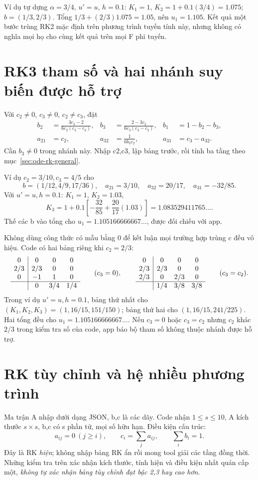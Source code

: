 Ví dụ tự dựng $\alpha=3/4$, $u'=u$, $h=0.1$: $K_1=1$, $K_2=1+0.1(3/4)=1.075$; $b=(1/3,2/3)$. Tổng $1/3+(2/3)1.075=1.05$, nên $u_1=1.105$. Kết quả một bước trùng RK2 mặc định trên phương trình tuyến tính này, nhưng không có nghĩa mọi họ cho cùng kết quả trên mọi F phi tuyến.

\section{RK3 tham số và hai nhánh suy biến được hỗ trợ}
\label{sec:ode-rk3-parameter}
Với $c_2\ne0$, $c_3\ne0$, $c_2\ne c_3$, đặt
\begin{align*}
b_2&=\frac{3c_3-2}{6c_2(c_3-c_2)},&
b_3&=\frac{2-3c_2}{6c_3(c_3-c_2)},&b_1&=1-b_2-b_3,\\
a_{21}&=c_2,&a_{32}&=\frac1{6b_3c_2},&a_{31}&=c_3-a_{32}.
\end{align*}
Cần $b_3\ne0$ trong nhánh này. Nhập c2,c3, lập bảng trước, rồi tính ba tầng theo mục~\ref{sec:ode-rk-general}.

Ví dụ $c_2=3/10,c_3=4/5$ cho
\[
b=(1/12,4/9,17/36),\quad a_{21}=3/10,
\quad a_{32}=20/17,\quad a_{31}=-32/85.
\]
Với $u'=u,h=0.1$: $K_1=1$, $K_2=1.03$,
\[
K_3=1+0.1\left[-\frac{32}{85}+\frac{20}{17}(1.03)\right]
=1.083529411765\ldots.
\]
Thế các b vào tổng cho $u_1=1.105166666667\ldots$, được đối chiếu với app.

Không dùng công thức có mẫu bằng 0 để kết luận mọi trường hợp trùng c đều vô hiệu. Code có hai bảng riêng khi $c_2=2/3$:
\[
\begin{array}{c|ccc}
0&0&0&0\\2/3&2/3&0&0\\0&-1&1&0\\\hline&0&3/4&1/4
\end{array}
\qquad(c_3=0),
\qquad
\begin{array}{c|ccc}
0&0&0&0\\2/3&2/3&0&0\\2/3&0&2/3&0\\\hline&1/4&3/8&3/8
\end{array}
\qquad(c_3=c_2).
\]
Trong ví dụ $u'=u,h=0.1$, bảng thứ nhất cho $(K_1,K_2,K_3)=(1,16/15,151/150)$; bảng thứ hai cho $(1,16/15,241/225)$. Hai tổng đều cho $u_1=1.105166666667\ldots$. Nếu $c_3=0$ hoặc $c_3=c_2$ nhưng $c_2$ khác $2/3$ trong kiểm tra số của code, app báo bộ tham số không thuộc nhánh được hỗ trợ.

\section{RK tùy chỉnh và hệ nhiều phương trình}
\label{sec:ode-rk-custom}
Ma trận A nhập dưới dạng JSON, b,c là các dãy. Code nhận $1\le s\le10$, A kích thước $s\times s$, b,c có s phần tử, mọi số hữu hạn. Điều kiện cấu trúc:
\[
a_{ij}=0\ (j\ge i),\qquad c_i=\sum_ja_{ij},\qquad\sum_i b_i=1.
\]
Đây là RK \emph{hiện}; không nhập bảng RK ẩn rồi mong tool giải các tầng đồng thời. Những kiểm tra trên xác nhận kích thước, tính hiện và điều kiện nhất quán cấp một, \emph{không tự xác nhận bảng tùy chỉnh đạt bậc 2,3 hay cao hơn}.

